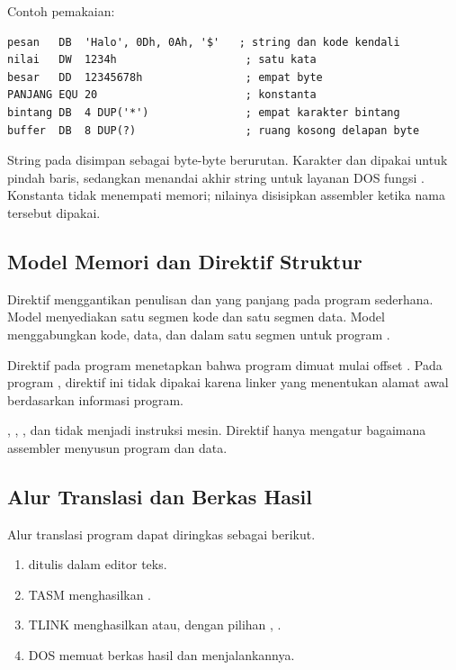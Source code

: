 Contoh pemakaian:

\begin{lstlisting}[language=MASM, numbers=none]
pesan   DB  'Halo', 0Dh, 0Ah, '$'   ; string dan kode kendali
nilai   DW  1234h                    ; satu kata
besar   DD  12345678h                ; empat byte
PANJANG EQU 20                       ; konstanta
bintang DB  4 DUP('*')               ; empat karakter bintang
buffer  DB  8 DUP(?)                 ; ruang kosong delapan byte
\end{lstlisting}

String pada  disimpan sebagai byte-byte berurutan. Karakter
 dan  dipakai untuk pindah baris, sedangkan
 menandai akhir string untuk layanan DOS fungsi
. Konstanta  tidak menempati memori; nilainya
disisipkan assembler ketika nama tersebut dipakai.

\subsection{Model Memori dan Direktif Struktur}

Direktif  menggantikan penulisan  dan
 yang panjang pada program sederhana. Model 
menyediakan satu segmen kode dan satu segmen data. Model 
menggabungkan kode, data, dan  dalam satu segmen untuk
program .

Direktif  pada program  menetapkan bahwa
program dimuat mulai offset . Pada program ,
direktif ini tidak dipakai karena linker yang menentukan alamat awal
berdasarkan informasi program.

\begin{infobox}
\vspace{1.1em}
 , , ,
dan  tidak menjadi instruksi mesin. Direktif hanya
mengatur bagaimana assembler menyusun program dan data.
\end{infobox}

\subsection{Alur Translasi dan Berkas Hasil}

Alur translasi program dapat diringkas sebagai berikut.

\begin{enumerate}
    \item {} ditulis dalam editor teks.
    \item TASM menghasilkan .
    \item TLINK menghasilkan  atau, dengan pilihan
          , .
    \item DOS memuat berkas hasil dan menjalankannya.
\end{enumerate}

